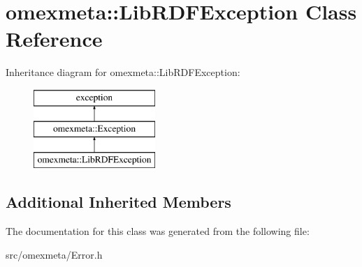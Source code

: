 \hypertarget{classomexmeta_1_1LibRDFException}{}\section{omexmeta\+:\+:Lib\+R\+D\+F\+Exception Class Reference}
\label{classomexmeta_1_1LibRDFException}
Inheritance diagram for omexmeta\+:\+:Lib\+R\+D\+F\+Exception\+:\begin{figure}[H]
\begin{center}
\leavevmode
\includegraphics[height=3.000000cm]{classomexmeta_1_1LibRDFException}
\end{center}
\end{figure}
\subsection*{Additional Inherited Members}


The documentation for this class was generated from the following file\+:\begin{DoxyCompactItemize}
\item 
src/omexmeta/Error.\+h\end{DoxyCompactItemize}
